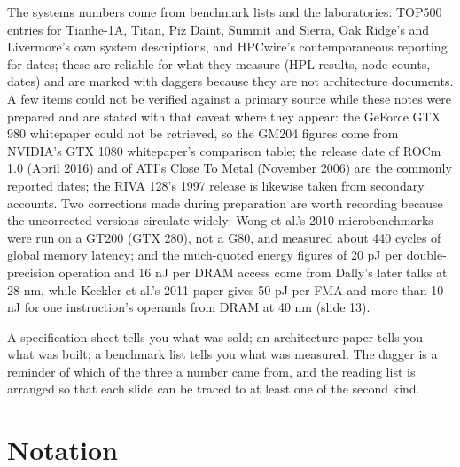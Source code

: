 \documentclass[11pt,letterpaper]{article}
\newcommand{\setstage}[1]{\colorlet{stagec}{#1}}
\newenvironment{intuition}{\begin{tcolorbox}[intuitionbox]}{\end{tcolorbox}}
\begin{document}
The systems numbers come from benchmark lists and the laboratories: TOP500 entries for Tianhe-1A, Titan, Piz Daint, Summit and Sierra, Oak Ridge's and Livermore's own system descriptions, and HPCwire's contemporaneous reporting for dates; these are reliable for what they measure (HPL results, node counts, dates) and are marked with daggers because they are not architecture documents. A few items could not be verified against a primary source while these notes were prepared and are stated with that caveat where they appear: the GeForce GTX 980 whitepaper could not be retrieved, so the GM204 figures come from NVIDIA's GTX 1080 whitepaper's comparison table; the release date of ROCm 1.0 (April 2016) and of ATI's Close To Metal (November 2006) are the commonly reported dates; the RIVA 128's 1997 release is likewise taken from secondary accounts. Two corrections made during preparation are worth recording because the uncorrected versions circulate widely: Wong et al.'s 2010 microbenchmarks were run on a GT200 (GTX 280), not a G80, and measured about 440 cycles of global memory latency; and the much-quoted energy figures of 20 pJ per double-precision operation and 16 nJ per DRAM access come from Dally's later talks at 28 nm, while Keckler et al.'s 2011 paper gives 50 pJ per FMA and more than 10 nJ for one instruction's operands from DRAM at 40 nm (slide 13).

\begin{intuition}
A specification sheet tells you what was sold; an architecture paper tells you what was built; a benchmark list tells you what was measured. The dagger is a reminder of which of the three a number came from, and the reading list is arranged so that each slide can be traced to at least one of the second kind.
\end{intuition}
\clearpage
\appendix
\setstage{ink}
\section{Notation}
\end{document}

